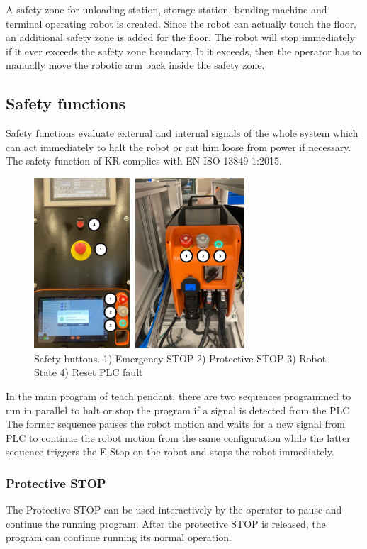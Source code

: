A safety zone for unloading station, storage station, bending machine and terminal operating
robot is created. Since the
robot can actually touch the floor, an additional safety zone is added for the floor. 
The robot will stop immediately if it ever exceeds the safety zone boundary. It it exceeds, 
then the operator
has to manually move the robotic arm back inside the safety zone. 

\subsection{Safety functions}
\label{subsec:safety-functions}
Safety functions evaluate external and internal signals of the whole system which can act immediately to
halt the robot or cut him loose from power if necessary. 
The safety function of KR complies with EN ISO 13849-1:2015. \cite{ISO13849}
\cite[page 13]{kassow-software-manual}

\begin{figure}[h]
    \centering
    \includegraphics[width=0.7\textwidth]{figures/safety-buttons.png}
    \caption{Safety buttons. 1) Emergency STOP 2) Protective STOP 3) Robot State 4) Reset PLC fault}
    \label{fig:safety-buttons}
\end{figure}

In the main program of teach pendant, there are two sequences programmed to run in parallel to halt or stop the program if a signal is detected
from the PLC. The former sequence pauses the robot motion and waits for a new signal from PLC to continue the robot motion from the same configuration while the latter sequence triggers the E-Stop on the robot and stops the robot immediately. 



\subsubsection{Protective STOP}
The Protective STOP can be used interactively by the operator to pause and continue the running program.
After the protective STOP is released, the program can continue running its normal operation.

